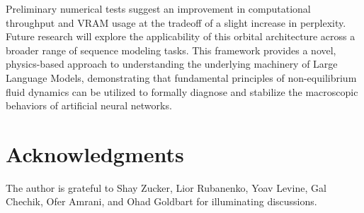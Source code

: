 \documentclass[10pt]{article}
\begin{document}
Preliminary numerical tests suggest an improvement in computational throughput and VRAM usage at the tradeoff of a slight increase in perplexity. Future research will explore the applicability of this orbital architecture across a broader range of sequence modeling tasks. This framework provides a novel, physics-based approach to understanding the underlying machinery of Large Language Models, demonstrating that fundamental principles of non-equilibrium fluid dynamics can be utilized to formally diagnose and stabilize the macroscopic behaviors of artificial neural networks.

\section*{Acknowledgments}

The author is grateful to Shay Zucker, Lior Rubanenko, Yoav Levine, Gal Chechik, Ofer Amrani, and Ohad Goldbart for illuminating discussions.
\end{document}

